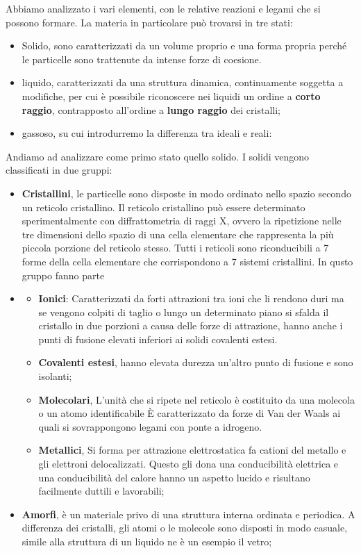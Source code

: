 \documentclass[11pt, a4paper, openright]{book}
\begin{document}
Abbiamo analizzato i vari elementi, con le relative reazioni e legami che si possono formare.
La materia in particolare può trovarsi in tre stati:
\begin{itemize}
    \item Solido, sono caratterizzati da un volume proprio e una forma propria perché le particelle sono trattenute da intense forze di coesione.
    \item liquido, caratterizzati da una struttura dinamica, continuamente soggetta a modifiche, per cui è possibile riconoscere nei liquidi un ordine a \textbf{corto raggio}, contrapposto all'ordine a \textbf{lungo raggio} dei cristalli;
    \item gassoso, su cui introdurremo la differenza tra ideali e reali:
\end{itemize}
Andiamo ad analizzare come primo stato quello solido. 
I solidi vengono classificati in due gruppi:
\begin{itemize}
    \item \textbf{Cristallini}, le particelle sono disposte in modo ordinato nello spazio secondo un reticolo cristallino. Il reticolo cristallino può essere determinato sperimentalmente con diffrattometria di raggi  X, ovvero la ripetizione nelle tre dimensioni dello spazio di una cella elementare che rappresenta la più piccola porzione del reticolo stesso. Tutti i reticoli sono riconducibili a 7 forme della cella elementare che corrispondono a 7 sistemi cristallini. In qusto gruppo fanno parte 
    \item \begin{itemize}
        \item \textbf{Ionici}: Caratterizzati da forti attrazioni tra ioni che li rendono duri ma se vengono colpiti di taglio o lungo un determinato piano si sfalda il cristallo in due porzioni a causa delle forze di attrazione, hanno anche i punti di fusione elevati inferiori ai solidi covalenti estesi.
        \item \textbf{Covalenti estesi}, hanno elevata durezza un'altro punto di fusione e sono isolanti;
        \item \textbf{Molecolari}, L'unità che si ripete nel reticolo è costituito da una molecola o un atomo identificabile È caratterizzato da forze di Van der Waals ai quali si sovrappongono legami con ponte a idrogeno. 
        \item \textbf{Metallici},  Si forma per attrazione elettrostatica fa cationi del metallo e gli elettroni delocalizzati. Questo gli dona una conducibilità elettrica e una conducibilità del calore hanno un aspetto lucido e risultano facilmente duttili e lavorabili;
    \end{itemize}
    \item \textbf{Amorfi}, è un materiale privo di una struttura interna ordinata e periodica. A differenza dei cristalli, gli atomi o le molecole sono disposti in modo casuale, simile alla struttura di un liquido ne è un esempio il vetro;
\end{itemize}
\end{document}
